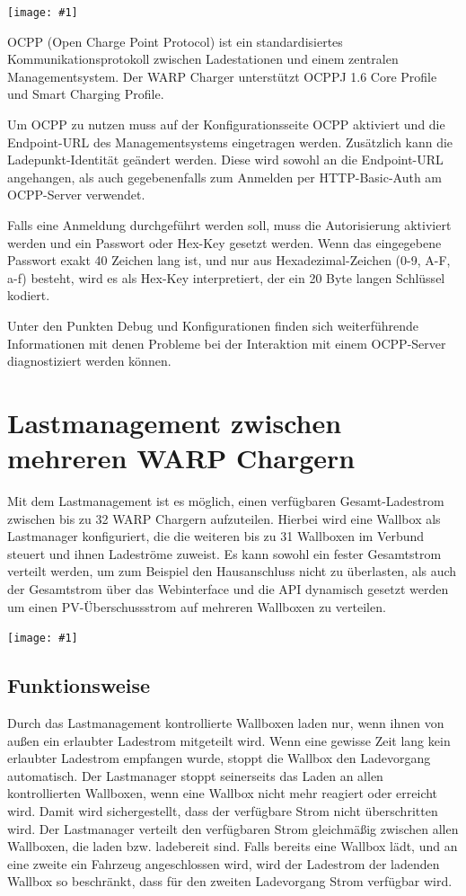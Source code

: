 \documentclass[a4paper,10pt]{article}
\newcommand{\gfx}[1]{\texttt{[image: \#1]}}
\begin{document}
\begin{multicols*}{2}
    \gfx{./img_warp2/resized/web_ocpp}

    OCPP (Open Charge Point Protocol) ist ein standardisiertes Kommunikationsprotokoll zwischen
    Ladestationen und einem zentralen Managementsystem. Der WARP Charger
    unterstützt OCPPJ 1.6 Core Profile und Smart Charging Profile.

    Um OCPP zu nutzen muss auf der Konfigurationsseite OCPP aktiviert und die
    Endpoint-URL des Managementsystems eingetragen werden. Zusätzlich kann die Ladepunkt-Identität
    geändert werden. Diese wird sowohl an die Endpoint-URL angehangen, als auch gegebenenfalls zum
    Anmelden per HTTP-Basic-Auth am OCPP-Server verwendet.

    Falls eine Anmeldung durchgeführt werden soll, muss die Autorisierung aktiviert werden
    und ein Passwort oder Hex-Key gesetzt werden. Wenn das eingegebene Passwort exakt 40 Zeichen lang ist,
    und nur aus Hexadezimal-Zeichen (0-9, A-F, a-f) besteht, wird es als Hex-Key interpretiert, der ein 20
    Byte langen Schlüssel kodiert.

    Unter den Punkten Debug und Konfigurationen finden sich weiterführende Informationen mit denen Probleme
    bei der Interaktion mit einem OCPP-Server diagnostiziert werden können.

    \newpage
    \section{Lastmanagement zwischen mehreren WARP Chargern}\label{charge_manager}
    Mit dem Lastmanagement ist es möglich, einen verfügbaren Gesamt-Ladestrom
    zwischen bis zu 32 WARP Chargern aufzuteilen. Hierbei wird eine Wallbox als
    Lastmanager konfiguriert, die die weiteren bis zu 31 Wallboxen im Verbund steuert und ihnen Ladeströme
    zuweist. Es kann sowohl ein fester Gesamtstrom verteilt werden, um zum Beispiel den Hausanschluss nicht zu überlasten,
    als auch der Gesamtstrom über das Webinterface und die API dynamisch gesetzt werden
    um einen PV-Überschussstrom auf mehreren Wallboxen zu verteilen.

    \gfx{./img_warp2/resized/web_charge_manager}

    \subsection{Funktionsweise}
    Durch das Lastmanagement kontrollierte Wallboxen laden nur,
    wenn ihnen von außen ein erlaubter Ladestrom mitgeteilt wird. Wenn eine gewisse Zeit lang
    kein erlaubter Ladestrom empfangen wurde, stoppt die Wallbox den Ladevorgang automatisch.
    Der Lastmanager stoppt seinerseits das Laden an allen kontrollierten Wallboxen,
    wenn eine Wallbox nicht mehr reagiert oder erreicht wird. Damit wird sichergestellt,
    dass der verfügbare Strom nicht überschritten wird.
    Der Lastmanager verteilt den verfügbaren Strom gleichmäßig zwischen allen Wallboxen, die laden bzw. ladebereit sind.
    Falls bereits eine Wallbox lädt, und an eine zweite ein Fahrzeug angeschlossen wird,
    wird der Ladestrom der ladenden Wallbox so beschränkt, dass für den zweiten Ladevorgang Strom verfügbar wird.


\end{multicols*}
\end{document}
